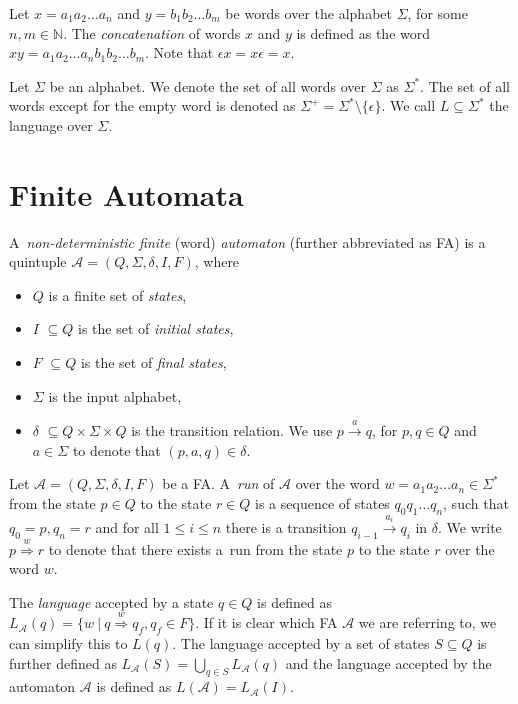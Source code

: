 Let $x = a_1a_2\ldots a_n$ and $y = b_1b_2\ldots b_m$ be words over the alphabet
$\Sigma$, for some $n, m \in \mathbb{N}$. The \emph{concatenation} of words $x$
and $y$ is defined as the word $xy = a_1a_2\ldots a_nb_1b_2\ldots b_m$. Note
that $\epsilon x = x \epsilon = x$.

Let $\Sigma$ be an alphabet. We denote the set of all words over $\Sigma$ as
$\Sigma^*$. The set of all words except for the empty word is denoted as
$\Sigma^+ = \Sigma^* \setminus \{\epsilon\}$. We call $L \subseteq \Sigma^*$ the
language over $\Sigma$.

 \section{Finite Automata}

 A~\emph{non-deterministic finite} (word) \emph{automaton} (further abbreviated
 as FA) is a quintuple $\mathcal{A} = (Q, \Sigma, \delta, I, F)$, where
  \begin{itemize}
\item $Q$ is a finite set of \emph{states}, \item $I$ $ \subseteq Q$ is the set
of \emph{initial states}, \item $F$ $ \subseteq Q$ is the set of \emph{final
states}, \item $\Sigma$ is the input alphabet, \item $\delta$ $ \subseteq Q
\times\Sigma\times Q$ is the transition relation. We use $p
\overset{a}{\longrightarrow} q$, for $p, q \in Q$ and $a \in \Sigma$ to denote
that $(p, a, q) \in \delta$.
	\end{itemize}
	
Let $\mathcal{A} = (Q, \Sigma, \delta, I, F)$ be a FA. A~\emph{run} of
$\mathcal{A}$ over the word $w = a_1a_2\ldots a_n \in \Sigma^*$ from the state
$p \in Q$ to the state $r \in Q$ is a sequence of states $q_0q_1\ldots q_n$,
such that $q_0 = p, q_n = r$ and for all $1 \leq i \leq n$ there is a transition
$q_{i-1} \overset{a_i}{\longrightarrow} q_i$ in $\delta$. We write $p
\overset{w}{\Longrightarrow} r$ to denote that there exists a~run from the state
$p$ to the state $r$ over the word $w$.
	
The \emph{language} accepted by a state $q \in Q$ is defined as
$L_{\mathcal{A}}(q) = \{w\ |\ q \overset{w}{\Longrightarrow} q_f, q_f \in F\}$.
If it is clear which FA $\mathcal{A}$ we are referring to, we can simplify
this to $L(q)$. The language accepted by a set of states $S \subseteq
Q$ is further defined as $L_{\mathcal{A}}(S) = \bigcup_{q \in S}
L_{\mathcal{A}}(q)$ and the language accepted by the automaton $\mathcal{A}$ is
defined as $L(\mathcal{A}) = L_{\mathcal{A}}(I)$.
	
